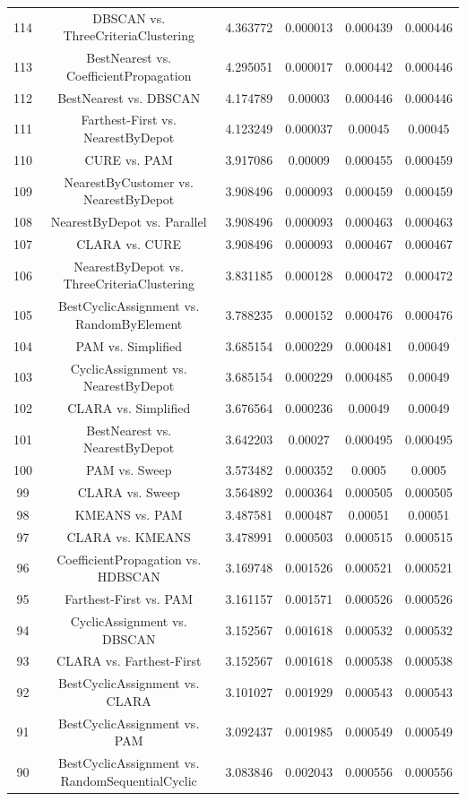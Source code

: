 \documentclass[a4paper,10pt]{article}
\begin{document}
\begin{landscape}
\begin{table}[!htp]
\begin{tabular}{cccccc}
114&DBSCAN vs. ThreeCriteriaClustering&4.363772&0.000013&0.000439&0.000446\\
113&BestNearest vs. CoefficientPropagation&4.295051&0.000017&0.000442&0.000446\\
112&BestNearest vs. DBSCAN&4.174789&0.00003&0.000446&0.000446\\
111&Farthest-First vs. NearestByDepot&4.123249&0.000037&0.00045&0.00045\\
110&CURE vs. PAM&3.917086&0.00009&0.000455&0.000459\\
109&NearestByCustomer vs. NearestByDepot&3.908496&0.000093&0.000459&0.000459\\
108&NearestByDepot vs. Parallel&3.908496&0.000093&0.000463&0.000463\\
107&CLARA vs. CURE&3.908496&0.000093&0.000467&0.000467\\
106&NearestByDepot vs. ThreeCriteriaClustering&3.831185&0.000128&0.000472&0.000472\\
105&BestCyclicAssignment vs. RandomByElement&3.788235&0.000152&0.000476&0.000476\\
104&PAM vs. Simplified&3.685154&0.000229&0.000481&0.00049\\
103&CyclicAssignment vs. NearestByDepot&3.685154&0.000229&0.000485&0.00049\\
102&CLARA vs. Simplified&3.676564&0.000236&0.00049&0.00049\\
101&BestNearest vs. NearestByDepot&3.642203&0.00027&0.000495&0.000495\\
100&PAM vs. Sweep&3.573482&0.000352&0.0005&0.0005\\
99&CLARA vs. Sweep&3.564892&0.000364&0.000505&0.000505\\
98&KMEANS vs. PAM&3.487581&0.000487&0.00051&0.00051\\
97&CLARA vs. KMEANS&3.478991&0.000503&0.000515&0.000515\\
96&CoefficientPropagation vs. HDBSCAN&3.169748&0.001526&0.000521&0.000521\\
95&Farthest-First vs. PAM&3.161157&0.001571&0.000526&0.000526\\
94&CyclicAssignment vs. DBSCAN&3.152567&0.001618&0.000532&0.000532\\
93&CLARA vs. Farthest-First&3.152567&0.001618&0.000538&0.000538\\
92&BestCyclicAssignment vs. CLARA&3.101027&0.001929&0.000543&0.000543\\
91&BestCyclicAssignment vs. PAM&3.092437&0.001985&0.000549&0.000549\\
90&BestCyclicAssignment vs. RandomSequentialCyclic&3.083846&0.002043&0.000556&0.000556\\

\end{tabular}
\end{table}
\end{landscape}
\end{document}
